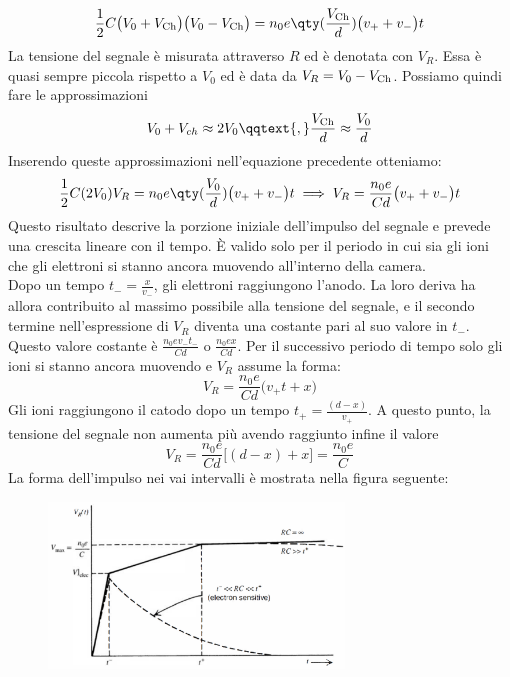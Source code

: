 \begin{approfondimento}
\begin{gather*}
      \frac{1}{2}C \bigl( V_0 + V_{\rm Ch} \bigr)\bigl( V_0 - V_{\rm Ch} \bigr)
      =n_0 e \qty( \frac{V_{\rm Ch}}{d} ) \bigl( v_{+} + v_{-} \bigr) t
   \end{gather*}
   La tensione del segnale è misurata attraverso $R$ ed è denotata con $V_R$. Essa è quasi sempre piccola rispetto a $V_0$ ed è data da $V_R=V_0-V_{\rm Ch}$. Possiamo quindi fare le approssimazioni
   \begin{equation*}
      V_0 + V_{ch} \approx 2 V_0
      \qqtext{,}
      \frac{V_{\rm Ch}}{d} \approx \frac{V_0}{d}
   \end{equation*}
   Inserendo queste approssimazioni nell'equazione precedente otteniamo:
   \begin{gather*}
      \frac{1}{2}C(2V_0)V_R=n_0 e \qty( \frac{V_0}{d} ) \bigl( v_{+} + v_{-} \bigr) t
      \implies
      V_R=\frac{n_0 e}{C d} \bigl( v_{+} + v_{-} \bigr) t
   \end{gather*}
   Questo risultato descrive la porzione iniziale dell'impulso del segnale e prevede una crescita lineare con il tempo. È valido solo per il periodo in cui sia gli ioni che gli elettroni si stanno ancora muovendo all'interno della camera.\\
   Dopo un tempo $t_{-}=\frac{x}{v_{-}}$, gli elettroni raggiungono l'anodo. La loro deriva ha allora contribuito al massimo possibile alla tensione del segnale, e il secondo termine nell'espressione di $V_R$ diventa una costante pari al suo valore in $t_{-}$. Questo valore costante è $\frac{n_0 e v_{-} t_{-}}{Cd}$ o $\frac{n_0 e x}{Cd}$. Per il successivo periodo di tempo solo gli ioni si stanno ancora muovendo e $V_R$ assume la forma:
   \begin{equation*}
      V_R=\frac{n_0 e}{Cd} \bigl( v_{+} t + x\bigr)
   \end{equation*}
   Gli ioni raggiungono il catodo dopo un tempo $ t_+ = \frac{(d - x)}{v_{+}} $. A questo punto, la tensione del segnale non aumenta più avendo raggiunto infine il valore
   \begin{equation*}
      V_R=\frac{n_0 e}{Cd} \bigl[ (d - x) + x \bigr]
      =\frac{n_0 e}{C}
   \end{equation*}
   La forma dell'impulso nei vai intervalli è mostrata nella figura seguente:
   \begin{figure}[H]
      \centering
      \includegraphics[width=0.7\textwidth]{immagini/forma_segnale_rivelatore_a_gas.png}

\end{figure}
\end{approfondimento}
